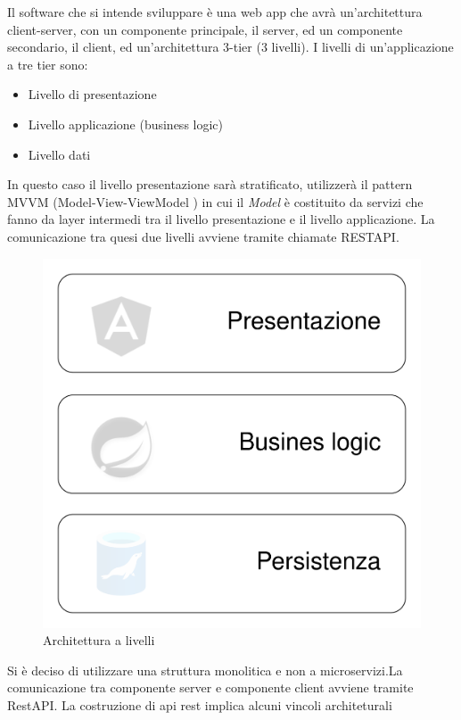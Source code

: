 \documentclass[a4paper,11pt]{article}
\begin{document}
Il software che si intende sviluppare è una web app che avrà un'architettura client-server, con un componente principale, il server, ed un componente secondario, il client, ed un'architettura 3-tier (3 livelli). I livelli di un'applicazione a tre tier sono:
\begin{itemize}
  \item Livello di presentazione
  \item Livello applicazione (business logic)
  \item Livello dati
\end{itemize}

In questo caso il livello presentazione sarà stratificato, utilizzerà il pattern MVVM (Model-View-ViewModel \cite{wikipediaModelviewviewmodelWikipedia}) in cui il \textit{Model} è costituito da servizi che fanno da layer intermedi tra il livello presentazione e il livello applicazione. La comunicazione tra quesi due livelli avviene tramite chiamate RESTAPI.

\begin{figure}[H]
  \includegraphics[width=1\linewidth]{img/arch0.png}
  \caption{Architettura a livelli}
  \label{fig:architettura a livelli}
\end{figure}

Si è deciso di utilizzare una struttura monolitica e non a microservizi.La comunicazione tra componente server e componente client avviene tramite RestAPI. La costruzione di api rest implica alcuni vincoli architeturali \cite{restfulapiRESTArchitectural}
\end{document}
